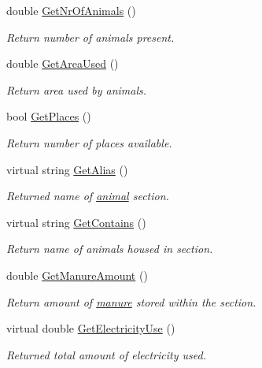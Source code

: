 \begin{DoxyCompactItemize}
double \hyperlink{classanimal_section_a724eda30485b354884e11a3c762b54c0}{GetNrOfAnimals} ()
\begin{DoxyCompactList}\small\item\em Return number of animals present. \item\end{DoxyCompactList}\item 
double \hyperlink{classanimal_section_a87002a34cbfb681aea527998573ae3bd}{GetAreaUsed} ()
\begin{DoxyCompactList}\small\item\em Return area used by animals. \item\end{DoxyCompactList}\item 
bool \hyperlink{classanimal_section_a263b40a7d973437e37ab791bb394dc1d}{GetPlaces} ()
\begin{DoxyCompactList}\small\item\em Return number of places available. \item\end{DoxyCompactList}\item 
virtual string \hyperlink{classanimal_section_a8273d771612eb157505ecacc6677c29f}{GetAlias} ()
\begin{DoxyCompactList}\small\item\em Returned name of \hyperlink{classanimal}{animal} section. \item\end{DoxyCompactList}\item 
virtual string \hyperlink{classanimal_section_a3373b12f97678e5c8f99e0d75a501438}{GetContains} ()
\begin{DoxyCompactList}\small\item\em Return name of animals housed in section. \item\end{DoxyCompactList}\item 
double \hyperlink{classanimal_section_ab0b8b5f3e6b25020195e24cd71d56309}{GetManureAmount} ()
\begin{DoxyCompactList}\small\item\em Return amount of \hyperlink{classmanure}{manure} stored within the section. \item\end{DoxyCompactList}\item 
virtual double \hyperlink{classanimal_section_a785811ba65d4822e7c3b284ce77cb67f}{GetElectricityUse} ()
\begin{DoxyCompactList}\small\item\em Returned total amount of electricity used. \item\end{DoxyCompactList}\item 

\end{DoxyCompactItemize}
